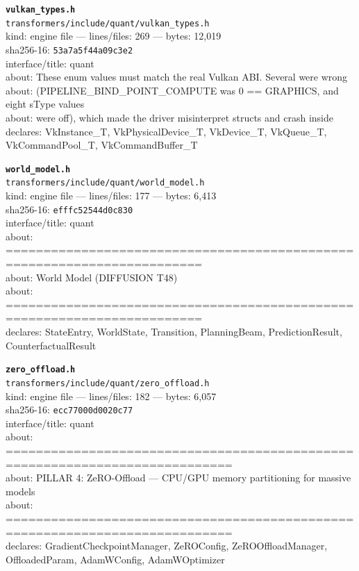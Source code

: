 \noindent\textbf{\texttt{vulkan\_types.h}}\\
\texttt{transformers/include/quant/vulkan\_types.h}\\
kind: engine file --- lines/files: 269 --- bytes: 12,019\\
sha256-16: \texttt{53a7a5f44a09c3e2}\\
interface/title: quant\\
about: These enum values must match the real Vulkan ABI. Several were wrong\\
about: (PIPELINE\_BIND\_POINT\_COMPUTE was 0 == GRAPHICS, and eight sType values\\
about: were off), which made the driver misinterpret structs and crash inside\\
declares: VkInstance\_T, VkPhysicalDevice\_T, VkDevice\_T, VkQueue\_T, VkCommandPool\_T, VkCommandBuffer\_T\\
\vspace*{6.0pt}

\noindent\textbf{\texttt{world\_model.h}}\\
\texttt{transformers/include/quant/world\_model.h}\\
kind: engine file --- lines/files: 177 --- bytes: 6,413\\
sha256-16: \texttt{efffc52544d0c830}\\
interface/title: quant\\
about: ========================================================================\\
about: World Model (DIFFUSION T48)\\
about: ========================================================================\\
declares: StateEntry, WorldState, Transition, PlanningBeam, PredictionResult, CounterfactualResult\\
\vspace*{6.0pt}
\newpage

\noindent\textbf{\texttt{zero\_offload.h}}\\
\texttt{transformers/include/quant/zero\_offload.h}\\
kind: engine file --- lines/files: 182 --- bytes: 6,057\\
sha256-16: \texttt{ecc77000d0020c77}\\
interface/title: quant\\
about: ============================================================================\\
about: PILLAR 4: ZeRO-Offload — CPU/GPU memory partitioning for massive models\\
about: ============================================================================\\
declares: GradientCheckpointManager, ZeROConfig, ZeROOffloadManager, OffloadedParam, AdamWConfig, AdamWOptimizer\\
\vspace*{6.0pt}

